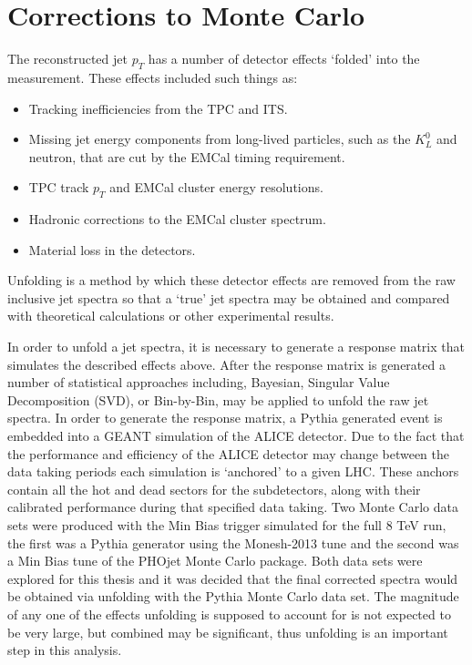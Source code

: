 \section{Corrections to Monte Carlo}

The reconstructed jet $p_{T}$ has a number of detector effects `folded' into the measurement.  These effects included such things as:

\begin{itemize}
\item Tracking inefficiencies from the TPC and ITS.
\item Missing jet energy components from long-lived particles, such as the $K^{0}_{L}$ and neutron, that are cut by the EMCal timing requirement.
\item TPC track $p_{T}$ and EMCal cluster energy resolutions.
\item Hadronic corrections to the EMCal cluster spectrum.
\item Material loss in the detectors.
\end{itemize}

\noindent
Unfolding is a method by which these detector effects are removed from the raw inclusive jet spectra so that a `true' jet spectra may be obtained and compared with theoretical calculations or other experimental results.  

In order to unfold a jet spectra, it is necessary to generate a response matrix that simulates the described effects above.  After the response matrix is generated a number of statistical approaches including, Bayesian, Singular Value Decomposition (SVD), or Bin-by-Bin, may be applied to unfold the raw jet spectra.  In order to generate the response matrix, a Pythia generated event is embedded into a GEANT simulation of the ALICE detector.  Due to the fact that the performance and efficiency of the ALICE detector may change between the data taking periods each simulation is `anchored' to a given LHC.  These anchors contain all the hot and dead sectors for the subdetectors, along with their calibrated performance during that specified data taking.  Two Monte Carlo data sets were produced with the Min Bias trigger simulated for the full 8 TeV run, the first was a Pythia generator using the Monesh-2013 tune and the second was a Min Bias tune of the PHOjet Monte Carlo package.  Both data sets were explored for this thesis and it was decided that the final corrected spectra would be obtained via unfolding with the Pythia Monte Carlo data set.  The magnitude of any one of the effects unfolding is supposed to account for is not expected to be very large, but combined may be significant, thus unfolding is an important step in this analysis.

